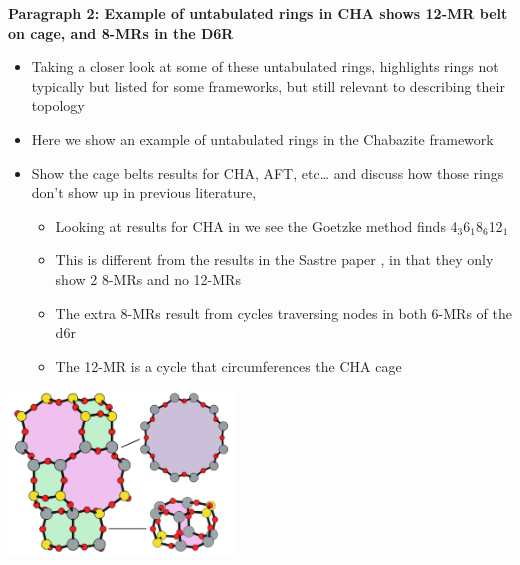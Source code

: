 \documentclass[11pt]{article}
\begin{document}
\textbf{\textbf{Paragraph 2: Example of untabulated rings in CHA shows 12-MR belt on cage, and 8-MRs in the D6R}}
\begin{itemize}
\item Taking a closer look at some of these untabulated rings, highlights rings not typically but listed for some frameworks, but still relevant to describing their topology
\item Here we show an example of untabulated rings in the Chabazite framework
\item Show the cage belts results for CHA, AFT, etc\ldots{} and discuss how those rings don't show up in previous literature, 
\begin{itemize}
\item Looking at results for CHA in  we see the Goetzke method finds 4\(_{\text{3}}\)\textbullet{}6\(_{\text{1}}\)\textbullet{}8\(_{\text{6}}\)\textbullet{}12\(_{\text{1}}\)
\item This is different from the results in the Sastre paper \cite{sastre-topological-2009}, in that they only show 2 8-MRs and no 12-MRs
\item The extra 8-MRs result from cycles traversing nodes in both 6-MRs of the d6r
\item The 12-MR is a cycle that circumferences the CHA cage
\end{itemize}
\end{itemize}
\begin{center}
\includegraphics[width=0.45\textwidth]{../figures/completed-figures/cha-all-rings.pdf}
\end{center}
\end{document}
